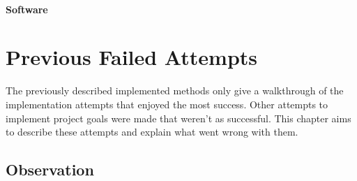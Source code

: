 				\subsubsection{Software}
				
	\chapter{Previous Failed Attempts}
	The previously described implemented methods only give a walkthrough of the implementation attempts that enjoyed the most success. Other attempts to implement project goals were made that weren't as successful. This chapter aims to describe these attempts and explain what went wrong with them.
		\section{Observation}
	